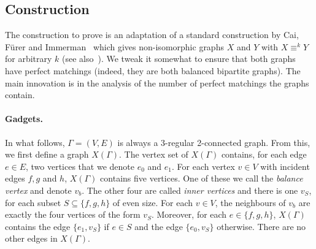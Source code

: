 \documentclass{toc}
\begin{document}
\subsection{Construction}\label{sec:construction}
The construction to prove  is an adaptation of a
standard construction by Cai, F\"{u}rer and Immerman~\cite{CFI92} which gives
non-isomorphic graphs $X$ and $Y$ with $X \equiv^k Y$ for arbitrary $k$ (see
also~\cite{DR07}). We tweak it somewhat to ensure that both graphs have perfect
matchings (indeed, they are both balanced bipartite graphs). The main innovation
is in the analysis of the number of perfect matchings the graphs contain.
\paragraph{Gadgets.}
In what follows, $\Gamma = (V,E)$ is always a 3-regular 2-connected graph. From this,
we first define a graph $X(\Gamma)$. The vertex set of $X(\Gamma)$ contains, for each edge
$e \in E$, two vertices that we denote $e_0$ and $e_1$. For each vertex $v\in V$
with incident edges $f,g$ and $h$, $X(\Gamma)$ contains five vertices. One of these
we call the \emph{balance vertex} and denote $v_b$. The other four are called
\emph{inner vertices} and there is one $v_S$, for each subset $S \subseteq
\{f,g,h\}$ of even size. For each $v \in V$, the neighbours of $v_b$ are exactly
the four vertices of the form $v_S$. Moreover, for each $e \in \{f,g,h\}$,
$X(\Gamma)$ contains the edge $\{e_1,v_S\}$ if $e \in S$ and the edge $\{e_0,v_S\}$
otherwise. There are no other edges in $X(\Gamma)$.
\end{document}
